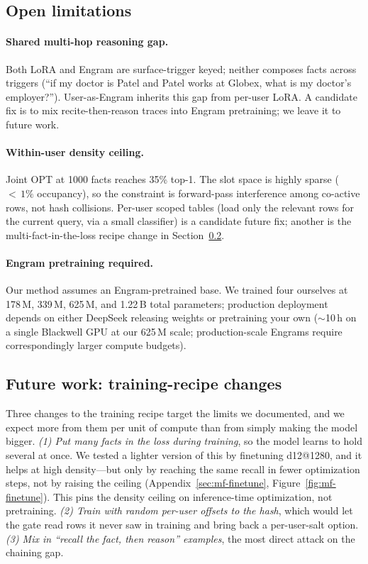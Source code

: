 \documentclass[letterpaper]{article} %
\begin{document}
\subsection{Open limitations}
\label{sec:limitations}

\paragraph{Shared multi-hop reasoning gap.}
Both LoRA and Engram are surface-trigger keyed; neither
composes facts across triggers (``if my doctor is Patel and
Patel works at Globex, what is my doctor's employer?'').
User-as-Engram inherits this gap from per-user LoRA. A candidate
fix is to mix recite-then-reason traces into Engram pretraining;
we leave it to future work.

\paragraph{Within-user density ceiling.}
Joint OPT at 1000 facts reaches 35\% top-1. The slot space is
highly sparse (${<}\,1\%$ occupancy), so the constraint is
forward-pass interference among co-active rows, not hash
collisions. Per-user scoped tables (load only the relevant rows
for the current query, via a small classifier) is a candidate
future fix; another is the multi-fact-in-the-loss recipe change
in Section~\ref{sec:future}.

\paragraph{Engram pretraining required.}
Our method assumes an Engram-pretrained base. We trained four
ourselves at 178\,M, 339\,M, 625\,M, and 1.22\,B total
parameters; production deployment depends on either DeepSeek
releasing weights or pretraining your own ($\sim$10\,h on a
single Blackwell GPU at our 625\,M scale; production-scale
Engrams require correspondingly larger compute budgets).

\subsection{Future work: training-recipe changes}
\label{sec:future}

Three changes to the training recipe target the limits we
documented, and we expect more from them per unit of compute than
from simply making the model bigger. \emph{(1) Put many facts in the
loss during training}, so the model learns to hold several at once.
We tested a lighter version of this by finetuning d12@1280, and it
helps at high density---but only by reaching the same recall in fewer
optimization steps, not by raising the ceiling
(Appendix~\ref{sec:mf-finetune}, Figure~\ref{fig:mf-finetune}). This
pins the density ceiling on inference-time optimization, not
pretraining. \emph{(2) Train with random per-user offsets to the
hash}, which would let the gate read rows it never saw in training and
bring back a per-user-salt option. \emph{(3) Mix in ``recall the fact,
then reason'' examples}, the most direct attack on the chaining gap.
\end{document}

